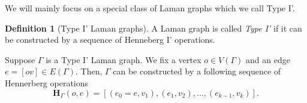 \documentclass[11pt]{amsart}
\theoremstyle{definition}
\newtheorem{defn}[thm]{Definition}
\theoremstyle{remark}
\numberwithin{equation}{section}
\begin{document}
We will mainly focus on a special class of Laman graphs which we call Type I'.
\begin{defn}[Type I' Laman graphs]
  A Laman graph is called \textit{Type I'} if it can be constructed by a sequence of Henneberg I' operations.
\end{defn}
\iffalse
Given a type 1 Laman graph $\Gamma$, we choose a vertex $o\in V(\Gamma)$ as the base point and fix an edge $e\in E(\Gamma)$ such that $V(e)=\{o,v\}$. From the triple $(\Gamma,o,e)$, one can obtain a poset $\mathbf{H}_{\Gamma}(o,e)$ such that its underlying set is $V(\Gamma)$. For each $u\in \mathbf{H}_{\Gamma}(o,e)-\{o,v\}$, the lower cover set $C_u=\{u',u''\}$ has cardinality 2 and $u',u''$ are comparable. Furthermore, let $C_{<u}=\{v_1,v_2\}$ , we have $v_1\in C_{<v_2}$ or $v_2\in C_{<v_1}$.

From the poset $\mathbf{H}_{\Gamma}(o,e)$, we can choose a total order extension $\vec{\mathbf{H}}_{\Gamma}(o,e)$. Each total order extension corresponds to a sequence of Hennerberg moves which starts from $(o,e)$ and results in $\Gamma$.
\fi

Suppose $\Gamma$ is a Type I' Laman graph.
We fix a vertex $o\in V(\Gamma)$ and an edge $e=[ov]\in E(\Gamma)$.
Then, $\Gamma$ can be constructed by a following sequence of Hennerberg operations
$$
\mathbf{H}_{\Gamma}(o,e)=[(e_0=e,v_1),(e_1,v_2),\dots,(e_{k-1},v_k)].
$$
\end{document}
